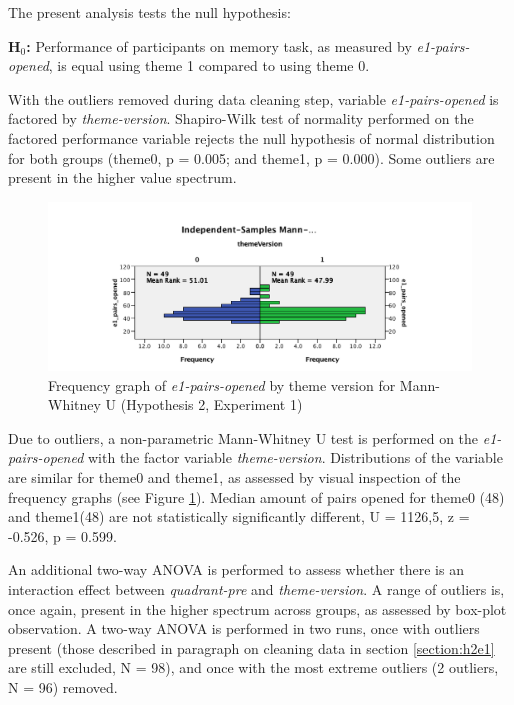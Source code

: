 		The present analysis tests the null hypothesis:
		
		\textbf{H$_{0}$:} Performance of participants on memory task, as measured by \textit{e1-pairs-opened}, is equal using theme 1 compared to using theme 0.
		
		With the outliers removed during data cleaning step, variable \textit{e1-pairs-opened} is factored by \textit{theme-version}. Shapiro-Wilk test of normality performed on the factored performance variable rejects the null hypothesis of normal distribution for both groups (theme0, p = 0.005; and theme1, p = 0.000).
		Some outliers are present in the higher value spectrum.
		
		\begin{figure}
			\centering
			\includegraphics[width=1\linewidth]{graphics/H2E1-MannWhitneyU}
			\caption{Frequency graph of \textit{e1-pairs-opened} by theme version for Mann-Whitney U (Hypothesis 2, Experiment 1)}
			\label{fig:h2e1-mannwhitneyu}
		\end{figure}
		
		Due to outliers, a non-parametric Mann-Whitney U test is performed on the \textit{e1-pairs-opened} with the factor variable \textit{theme-version}. Distributions of the variable are similar for theme0 and theme1, as assessed by visual inspection of the frequency graphs (see Figure \ref{fig:h2e1-mannwhitneyu}). Median amount of pairs opened for theme0 (48) and theme1(48) are not statistically significantly different, U = 1126,5, z = -0.526, p = 0.599.
		
		An additional two-way ANOVA is performed to assess whether there is an interaction effect between \textit{quadrant-pre} and \textit{theme-version}. A range of outliers is, once again, present in the higher spectrum across groups, as assessed by box-plot observation. A two-way ANOVA is performed in two runs, once with outliers present (those described in paragraph on cleaning data in section \ref{section:h2e1} are still excluded, N = 98), and once with the most extreme outliers (2 outliers, N = 96) removed.
		
